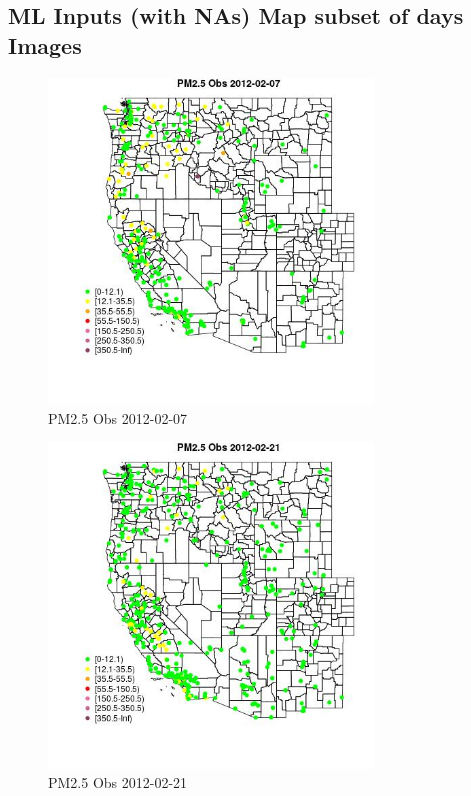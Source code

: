
\subsection{ML Inputs (with NAs) Map subset of days Images} 
 

\begin{figure} 
\centering  
\includegraphics[width=0.77\textwidth]{Code_Outputs/Report_ML_input_PM25_Step4_part_f_de_duplicated_aves_prioritize_24hr_obswNAs_MapObsPM25_Obs2012-02-07.jpg} 
\caption{\label{fig:Report_ML_input_PM25_Step4_part_f_de_duplicated_aves_prioritize_24hr_obswNAsMapObsPM25_Obs2012-02-07}PM2.5 Obs 2012-02-07} 
\end{figure} 
 

\begin{figure} 
\centering  
\includegraphics[width=0.77\textwidth]{Code_Outputs/Report_ML_input_PM25_Step4_part_f_de_duplicated_aves_prioritize_24hr_obswNAs_MapObsPM25_Obs2012-02-21.jpg} 
\caption{\label{fig:Report_ML_input_PM25_Step4_part_f_de_duplicated_aves_prioritize_24hr_obswNAsMapObsPM25_Obs2012-02-21}PM2.5 Obs 2012-02-21} 
\end{figure} 
 

